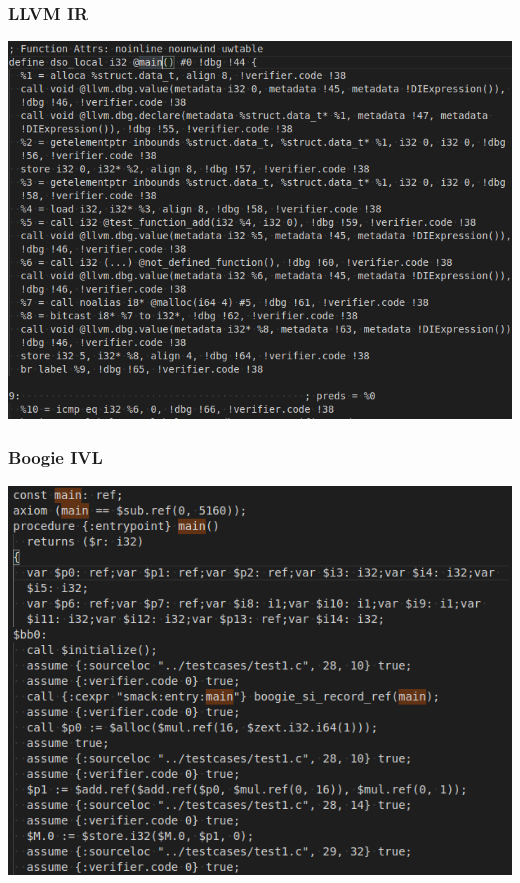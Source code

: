 \documentclass[11pt]{beamer}
\begin{document}
\begin{frame}\frametitle{LLVM IR}
\begin{center}
\includegraphics[scale=0.4]{llvm_ir_text.png}
\end{center}
\end{frame}

\begin{frame}\frametitle{Boogie IVL}
\begin{center}
\includegraphics[scale=0.4]{boogie_main.png}
\end{center}
\end{frame}
\end{document}
